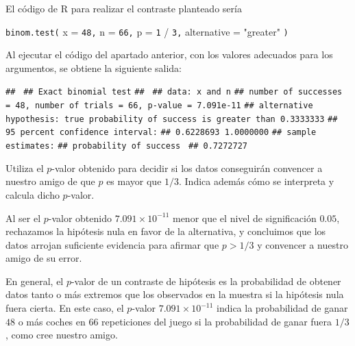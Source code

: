 \documentclass[
  notoc,
  nobib,
  degree=mec]{mnye}
\newenvironment{Shaded}{\begin{snugshade}}{\end{snugshade}}
\newcommand{\AttributeTok}[1]{\textcolor[rgb]{0.77,0.63,0.00}{#1}}
\newcommand{\DecValTok}[1]{\textcolor[rgb]{0.00,0.00,0.81}{#1}}
\newcommand{\FunctionTok}[1]{\textcolor[rgb]{0.00,0.00,0.00}{#1}}
\newcommand{\NormalTok}[1]{#1}
\newcommand{\SpecialCharTok}[1]{\textcolor[rgb]{0.00,0.00,0.00}{#1}}
\newcommand{\StringTok}[1]{\textcolor[rgb]{0.31,0.60,0.02}{#1}}
\renewcommand{\DecValTok}[1]{\textcolor[RGB]{64, 160, 112}{\texttt{#1}}}
\renewcommand{\FunctionTok}[1]{\textcolor[rgb]{0.13,0.29,0.53}{\texttt{#1}}}
\renewcommand{\NormalTok}[1]{\texttt{#1}}
\begin{document}
\begin{ex}
\begin{parts}
\begin{sol}
El código de \textsf{R} para realizar el contraste planteado sería

\begin{Shaded}
\begin{Highlighting}[]
\FunctionTok{binom.test}\NormalTok{(}
  \AttributeTok{x =} \DecValTok{48}\NormalTok{,}
  \AttributeTok{n =} \DecValTok{66}\NormalTok{,}
  \AttributeTok{p =} \DecValTok{1} \SpecialCharTok{/} \DecValTok{3}\NormalTok{,}
  \AttributeTok{alternative =} \StringTok{"greater"}
\NormalTok{)}
\end{Highlighting}
\end{Shaded}

\end{sol}

\item

Al ejecutar el código del apartado anterior, con los valores adecuados para los argumentos, se obtiene la siguiente salida:

\begin{Shaded}
\begin{Highlighting}[]
\NormalTok{\#\# }
\NormalTok{\#\#  Exact binomial test}
\NormalTok{\#\# }
\NormalTok{\#\# data:  x and n}
\NormalTok{\#\# number of successes = 48, number of trials = 66, p{-}value = 7.091e{-}11}
\NormalTok{\#\# alternative hypothesis: true probability of success is greater than 0.3333333}
\NormalTok{\#\# 95 percent confidence interval:}
\NormalTok{\#\#  0.6228693 1.0000000}
\NormalTok{\#\# sample estimates:}
\NormalTok{\#\# probability of success }
\NormalTok{\#\#              0.7272727}
\end{Highlighting}
\end{Shaded}

Utiliza el \(p\)-valor obtenido para decidir si los datos conseguirán convencer a nuestro amigo de que \(p\) es mayor que \(1/3\). Indica además cómo se interpreta y calcula dicho \(p\)-valor.

\begin{sol}
Al ser el \(p\)-valor obtenido \(\ensuremath{7.091\times 10^{-11}}\) menor que el nivel de significación \(0.05\), rechazamos la hipótesis nula en favor de la alternativa, y concluimos que los datos arrojan suficiente evidencia para afirmar que \(p>1/3\) y convencer a nuestro amigo de su error.

En general, el \(p\)-valor de un contraste de hipótesis es la probabilidad de obtener datos tanto o más extremos que los observados en la muestra si la hipótesis nula fuera cierta.
En este caso, el \(p\)-valor \(\ensuremath{7.091\times 10^{-11}}\) indica la probabilidad de ganar \(48\) o más coches en \(66\) repeticiones del juego si la probabilidad de ganar fuera \(1/3\), como cree nuestro amigo.


\end{sol}
\end{parts}
\end{ex}
\end{document}
